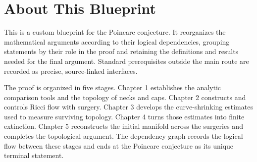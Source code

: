 

\chapter*{About This Blueprint}

This is a custom blueprint for the Poincare conjecture. It reorganizes the
mathematical arguments according to their logical dependencies, grouping
statements by their role in the proof and retaining the definitions and results
needed for the final argument. Standard prerequisites outside the main route
are recorded as precise, source-linked interfaces.

The proof is organized in five stages. Chapter 1 establishes the analytic
comparison tools and the topology of necks and caps. Chapter 2 constructs and
controls Ricci flow with surgery. Chapter 3 develops the curve-shrinking
estimates used to measure surviving topology. Chapter 4 turns those estimates
into finite extinction. Chapter 5 reconstructs the initial manifold across the
surgeries and completes the topological argument. The dependency graph records
the logical flow between these stages and ends at the Poincare conjecture as its
unique terminal statement.










